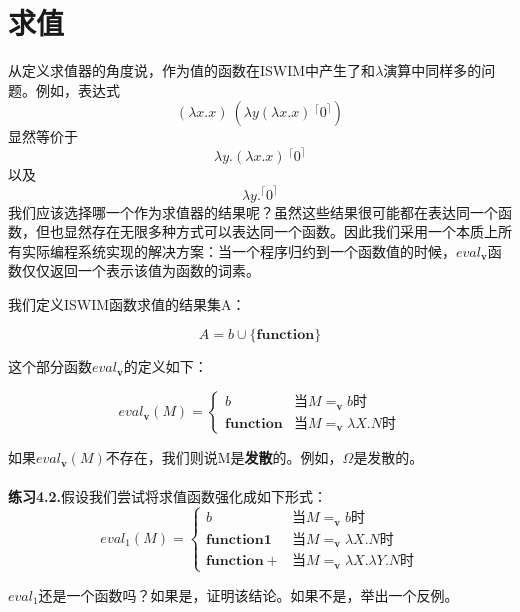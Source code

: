 \documentclass{book}
\def\v{\mathbf{v}}
\def\lianxi{\noindent \makebox[0pt][r]{$\rhd$} \textbf}
\begin{document}
\section{求值}
从定义求值器的角度说，作为值的函数在ISWIM中产生了和$\lambda$演算中同样多的问题。例如，表达式
$$
(\lambda x.x)\ (\lambda y(\lambda x.x)\ {}^\lceil 0^\rceil)
$$
显然等价于
$$
\lambda y.(\lambda x.x)\ {}^\lceil 0^\rceil
$$
以及
$$
\lambda y.{}^\lceil 0^\rceil
$$
我们应该选择哪一个作为求值器的结果呢？虽然这些结果很可能都在表达同一个函数，但也显然存在无限多种方式可以表达同一个函数。因此我们采用一个本质上所有实际编程系统实现的解决方案：当一个程序归约到一个函数值的时候，$eval_{\mathbf{v}}$函数仅仅返回一个表示该值为函数的词素。\par
我们定义ISWIM函数求值的结果集A：
\begin{framed}
 $$
 A=b\cup \{\mathbf{function}\}
 $$
\end{framed}
这个部分函数$eval_{\mathbf{v}}$的定义如下：
\begin{framed}
$$
  eval_{\mathbf{v}}(M)=
  \begin{cases}
  b & \text{当$M=_{\mathbf{v}}b$时} \\
  \mathbf{function} & \text{当$M=_{\mathbf{v}}\lambda X.N$时}
  \end{cases}
$$
  \end{framed}
如果$eval_{\mathbf{v}}(M)$不存在，我们则说M是\textbf{发散}的。例如，$\Omega$是发散的。\\\\
\lianxi{练习4.2.}假设我们尝试将求值函数强化成如下形式：
$$
eval_1(M)=
\begin{cases}
 b & \text{当$M=_\v b$时}\\
 \mathbf{function1} & \text{当$M=_\v \lambda X.N$时}\\
 \mathbf{function+} & \text{当$M=_\v \lambda X.\lambda Y.N$时}
\end{cases}$$

$eval_1$还是一个函数吗？如果是，证明该结论。如果不是，举出一个反例。
\end{document}
